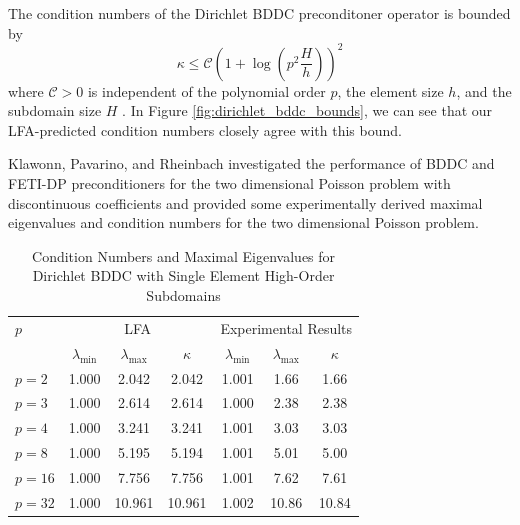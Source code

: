 \documentclass[review]{siamart190516}
\begin{document}
The condition numbers of the Dirichlet BDDC preconditoner operator is bounded by
\begin{equation}
\kappa \leq \mathcal{C} \left( 1 + \log \left( p^2 \frac{H}{h} \right) \right)^2
\end{equation}
where $\mathcal{C} > 0$ is independent of the polynomial order $p$, the element size $h$, and the subdomain size $H$ \cite{klawonn2008spectral}.
In Figure \ref{fig:dirichlet_bddc_bounds}, we can see that our LFA-predicted condition numbers closely agree with this bound.

Klawonn, Pavarino, and Rheinbach investigated the performance of BDDC and FETI-DP preconditioners for the two dimensional Poisson problem with discontinuous coefficients \cite{klawonn2008spectral} and provided some experimentally derived maximal eigenvalues and condition numbers for the two dimensional Poisson problem.

\begin{table}[ht!]
\begin{center}
\begin{tabular}{l ccc ccc}
  \toprule
  $p$  &  \multicolumn{3}{c}{LFA}  &  \multicolumn{3}{c}{Experimental Results}  \\
                      &  $\lambda_{\text{min}}$  &  $\lambda_{\text{max}}$  &  $\kappa$ & $\lambda_{\text{min}}$  &  $\lambda_{\text{max}}$ & $\kappa$  \\
  \toprule
  $p = 2$   &  1.000  &   2.042  &   2.042  &  1.001  &   1.66  &   1.66  \\
  $p = 3$   &  1.000  &   2.614  &   2.614  &  1.000  &   2.38  &   2.38  \\
  $p = 4$   &  1.000  &   3.241  &   3.241  &  1.001  &   3.03  &   3.03  \\
  $p = 8$   &  1.000  &   5.195  &   5.194  &  1.001  &   5.01  &   5.00  \\
  $p = 16$  &  1.000  &   7.756  &   7.756  &  1.001  &   7.62  &   7.61  \\
  $p = 32$  &  1.000  &  10.961  &  10.961  &  1.002  &  10.86  &  10.84  \\
  \bottomrule
\end{tabular}
\end{center}
\caption{Condition Numbers and Maximal Eigenvalues for Dirichlet BDDC with Single Element High-Order Subdomains}
\label{table:high_order_bddc_experiments_1}
\end{table}
\end{document}

